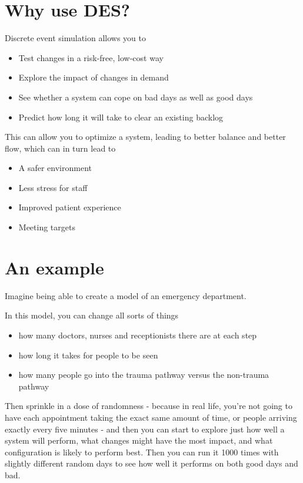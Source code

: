 \documentclass[
  letterpaper,
  DIV=11,
  numbers=noendperiod]{scrreprt}
\providecommand{\tightlist}{%
  \setlength{\itemsep}{0pt}\setlength{\parskip}{0pt}}\usepackage{longtable,booktabs,array}
\begin{document}
\section{Why use DES?}\label{why-use-des}

Discrete event simulation allows you to

\begin{itemize}
\tightlist
\item
  Test changes in a risk-free, low-cost way
\item
  Explore the impact of changes in demand
\item
  See whether a system can cope on bad days as well as good days
\item
  Predict how long it will take to clear an existing backlog
\end{itemize}

This can allow you to optimize a system, leading to better balance and
better flow, which can in turn lead to

\begin{itemize}
\tightlist
\item
  A safer environment
\item
  Less stress for staff
\item
  Improved patient experience
\item
  Meeting targets
\end{itemize}

\section{An example}\label{an-example}

Imagine being able to create a model of an emergency department.

In this model, you can change all sorts of things

\begin{itemize}
\tightlist
\item
  how many doctors, nurses and receptionists there are at each step
\item
  how long it takes for people to be seen
\item
  how many people go into the trauma pathway versus the non-trauma
  pathway
\end{itemize}

Then sprinkle in a dose of randomness - because in real life, you're not
going to have each appointment taking the exact same amount of time, or
people arriving exactly every five minutes - and then you can start to
explore just how well a system will perform, what changes might have the
most impact, and what configuration is likely to perform best. Then you
can run it 1000 times with slightly different random days to see how
well it performs on both good days and bad.
\end{document}

